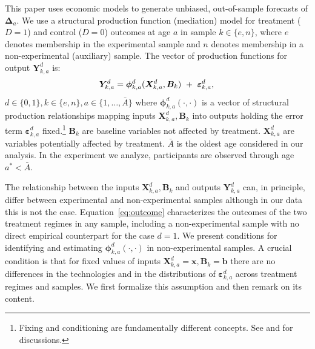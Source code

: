 \noindent This paper uses economic models to generate unbiased, out-of-sample forecasts of $\bm{\Delta}_a$. We use a structural production function (mediation) model for treatment ($D=1$) and control ($D=0$) outcomes at age $a$ in sample $k \in \{e,n\}$, where $e$ denotes membership in the experimental sample and $n$ denotes membership in a non-experimental (auxiliary) sample. The vector of production functions for output $\bm{Y}^d_{k,a}$ is:
\begin{equation}
\bm{Y}^d_{k,a} = \bm{\phi}^d_{k,a} (\bm{X}^d_{k,a}, \bm{B}_k) \ + \ \bm{\varepsilon}^d_{k,a},  \label{eq:outcome} \\
\end{equation}
$d \in\{0,1\},  k\in\{e,n\}, a\in\{1,\dots,\bar{A}\}$ where $\bm{\phi}^d_{k,a}\left( \cdot, \cdot \right)$ is a vector of structural production relationships mapping inputs $\bm{X}^d_{k,a}, \bm{B}_k$ into outputs holding the error term $\bm{\varepsilon}^d_{k,a}$ fixed.\footnote{Fixing and conditioning are fundamentally different concepts. See \cite{Haavelmo_1943_Econometrica} and \citet{Heckman_Pinto_2015_EconometReviews} for discussions.} $ \bm{B}_k$ are baseline variables not affected by treatment. $\bm{X}^d_{k,a}$ are variables potentially affected by treatment. $\bar{A}$ is the oldest age considered in our analysis. In the experiment we analyze, participants are observed through age $a^*< \bar{A}$.

The relationship between the inputs $\bm{X}^d_{k,a}, \bm{B}_k$ and outputs $\bm{Y}^d_{k,a}$ can, in principle, differ between experimental and non-experimental samples although in our data this is not the case. Equation~\eqref{eq:outcome} characterizes the outcomes of the two treatment regimes in any sample, including a non-experimental sample with no direct empirical counterpart for the case $d = 1$. We present conditions for identifying and estimating $\bm{\phi}^d_{k,a}\left( \cdot, \cdot \right)$ in non-experimental samples. A crucial condition is that for fixed values of inputs $\bm{X}^d_{k,a} = \bm{x}, \bm{B}_k = \bm{b}$ there are no differences in the technologies and in the distributions of $\bm{\varepsilon}_{k,a}^d$ across treatment regimes and samples. We first formalize this assumption and then remark on its content.

\onehalfspacing

